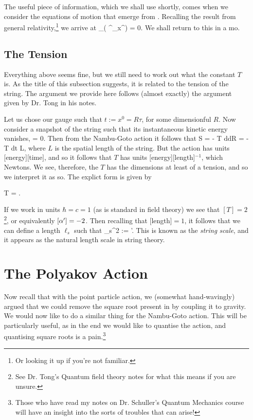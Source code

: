 The useful piece of information, which we shall use shortly, comes when we consider the equations of motion that emerge from . Recalling the result from general relativity,\footnote{Or looking it up if you're not familiar.} we arrive at 
\be 
\label{eqn:EOMInducedMetric}
    \p_{\a}\Big(\sqrt{-\det\g} \g^{\a\beta}\p_{\beta}x^{\mu}\Big) = 0.
\ee 
We shall return to this in a mo. 

\subsection{The Tension}

Everything above seems fine, but we still need to work out what the constant $T$ is. As the title of this subsection suggests, it is related to the tension of the string. The argument we provide here follows (almost exactly) the argument given by Dr. Tong in his notes. 

Let us chose our gauge such that $t:= x^0=R\tau$, for some dimensionful $R$. Now consider a snapshot of the string such that its instantaneous kinetic energy vanishes, 
\bse 
     = 0.
\ese 
Then from the Nambu-Goto action it follows that 
\bse
    S = - T \int d\sig d\tau R  = -T \int dt L,
\ese 
where $L$ is the spatial length of the string. But the action has units [energy][time], and so it follows that $T$ has units [energy][length]$^{-1}$, which Newtons. We see, therefore, the $T$ has the dimensions at least of a tension, and so we interpret it as so. The explict form is given by

\bse 
    T = .
\ese 

If we work in units $\hbar = c = 1$ (as is standard in field theory) we see that $[T]=2$\footnote{See Dr. Tong's Quantum field theory notes for what this means if you are unsure.}, or equivalently $[\alpha']=-2$. Then recalling that [length$]=1$, it follows that we can define a length $\ell_s$ such that 
\be
\label{eqn:StringScale}
    \ell_s^2 := \a'.
\ee  
This is known as the \textit{string scale}, and it appears as the natural length scale in string theory. 

\section{The Polyakov Action}

Now recall that with the point particle action, we (somewhat hand-wavingly) argued that we could remove the square root present in  by coupling it to gravity. We would now like to do a similar thing for the Nambu-Goto action. This will be particularly useful, as in the end we would like to quantise the action, and quantising square roots is a pain.\footnote{Those who have read my notes on Dr. Schuller's Quantum Mechanics course will have an insight into the sorts of troubles that can arise!}

